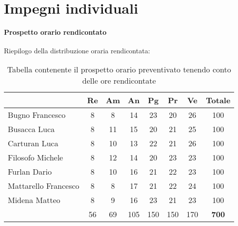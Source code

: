 \section{Impegni individuali} \label{section:impegni_individuali}

\paragraph{Prospetto orario rendicontato}
Riepilogo della distribuzione oraria rendicontata:

\begin{table}[H]
  \centering
  \renewcommand{\arraystretch}{1.8}
  \begin{tabular}{l|cccccc|c}
    \rowcolor[HTML]{125E28} 
    \multicolumn{1}{c}{\color[HTML]{FFFFFF}\textbf{Nome}} 
    & \color[HTML]{FFFFFF}\textbf{Re} 
    & \color[HTML]{FFFFFF}\textbf{Am} 
    & \color[HTML]{FFFFFF}\textbf{An} 
    & \color[HTML]{FFFFFF}\textbf{Pg} 
    & \color[HTML]{FFFFFF}\textbf{Pr} 
    & \color[HTML]{FFFFFF}\textbf{Ve} 
    & \color[HTML]{FFFFFF}\textbf{Totale} \\
    \hline
    Bugno Francesco         & 8   & 8   & 14  & 23  & 20  & 26  & 100 \\
    Busacca Luca            & 8   & 11  & 15  & 20  & 21  & 25  & 100 \\
    Carturan Luca           & 8   & 10  & 13  & 22  & 21  & 26  & 100 \\
    Filosofo Michele        & 8   & 12  & 14  & 20  & 23  & 23  & 100 \\
    Furlan Dario 						& 8	  & 10	& 16  & 21 	& 22	& 23 	& 100 \\
    Mattarello Francesco    & 8   & 8   & 17  & 21  & 22  & 24  & 100 \\
    Midena Matteo           & 8   & 9   & 16  & 23  & 21  & 23  & 100 \\
    \hline
    \rowcolor[HTML]{125E28}
    \multicolumn{1}{c}{\color[HTML]{FFFFFF}\textbf{Totale}} 
    & \color[HTML]{FFFFFF}56 
    & \color[HTML]{FFFFFF}69 
    & \color[HTML]{FFFFFF}105 
    & \color[HTML]{FFFFFF}150  
    & \color[HTML]{FFFFFF}150 
    & \color[HTML]{FFFFFF}170 
    & \color[HTML]{FFFFFF}\textbf{700}              
  \end{tabular}
  \caption{Tabella contenente il prospetto orario preventivato tenendo conto delle ore rendicontate}
\end{table}
